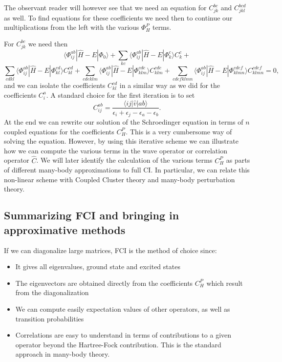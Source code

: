 The observant reader will however see that we need an equation for $C_{jk}^{bc}$ and $C_{jkl}^{bcd}$ as well.
To find equations for these coefficients we need then to continue our multiplications from the left with the various
$\Phi_{H}^P$ terms. 


For $C_{jk}^{bc}$ we need then
\[
\langle \Phi_{ij}^{ab} | \hat{H} -E| \Phi_0\rangle + \sum_{kc}\langle \Phi_{ij}^{ab} | \hat{H} -E|\Phi_{k}^{c} \rangle C_{k}^{c}+
\]
\[
\sum_{cdkl}\langle \Phi_{ij}^{ab} | \hat{H} -E|\Phi_{kl}^{cd} \rangle C_{kl}^{cd}+\sum_{cdeklm}\langle \Phi_{ij}^{ab} | \hat{H} -E|\Phi_{klm}^{cde} \rangle C_{klm}^{cde}+\sum_{cdefklmn}\langle \Phi_{ij}^{ab} | \hat{H} -E|\Phi_{klmn}^{cdef} \rangle C_{klmn}^{cdef}=0,
\]
and we can isolate the coefficients $C_{kl}^{cd}$ in a similar way as we did for the coefficients $C_{i}^{a}$. 
A standard choice for the first iteration is to set 
\[
C_{ij}^{ab} =\frac{\langle ij \vert \hat{v} \vert ab \rangle}{\epsilon_i+\epsilon_j-\epsilon_a-\epsilon_b}.
\]
At the end we can rewrite our solution of the Schroedinger equation in terms of $n$ coupled equations for the coefficients $C_H^P$.
This is a very cumbersome way of solving the equation. However, by using this iterative scheme we can illustrate how we can compute the
various terms in the wave operator or correlation operator $\hat{C}$. We will later identify the calculation of the various terms $C_H^P$
as parts of different many-body approximations to full CI. In particular, we can  relate this non-linear scheme with Coupled Cluster theory and
many-body perturbation theory.


\subsection{Summarizing FCI and bringing in approximative methods}


If we can diagonalize large matrices, FCI is the method of choice since:
\begin{itemize}
\item It gives all eigenvalues, ground state and excited states

\item The eigenvectors are obtained directly from the coefficients $C_H^P$ which result from the diagonalization

\item We can compute easily expectation values of other operators, as well as transition probabilities

\item Correlations are easy to understand in terms of contributions to a given operator beyond the Hartree-Fock contribution. This is the standard approach in  many-body theory. 
\end{itemize}

